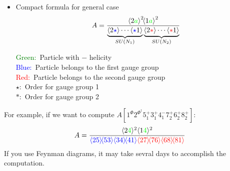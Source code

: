 \documentclass{beamer}
\newcommand{\avg}[1]{\langle #1 \rangle}
\newcommand{\mdavg}[2]{\langle #1 \rangle\!\langle #2 \rangle}
\newcommand{\asqu}[1]{{\langle#1\rangle}^2}
\begin{document}
\begin{frame}
    \begin{itemize}
        \item Compact formula for general case
        \begin{equation*}
            A=\frac{\asqu{2\textcolor{green}{a}}\!\asqu{1\textcolor{green}{a}}}{\underbrace{\avg{2\textcolor{blue}{\star}}\cdots \avg{\textcolor{blue}{\star}1}}_{SU(N_1)}\underbrace{\avg{2\textcolor{red}{\ast} }\cdots \avg{\textcolor{red}{\ast} 1}}_{SU(N_2)}}
        \end{equation*} 
        \begin{minipage}{0.7\textwidth}
            \raggedright  %
            \textcolor{green}{Green:} \,Particle with $-$ helicity\\
            \textcolor{blue}{Blue:}\, Particle belongs to the first gauge group\\
            \textcolor{red}{Red:}\, Particle belongs to the second gauge group\\
            $\star$: \,Order for gauge group 1\\
            $\ast$: \,Order for gauge group 2 
            \end{minipage}
       
    \end{itemize}
    \pause
    For example, if we want to compute $A[1^\Phi2^{\Phi^\dagger}5_1^+3_1^+4_1^-7_2^+6_2^+8_2^+]$:
    \begin{equation*}
        A=\frac{\avg{2\textcolor{green}{4}}^2\avg{1\textcolor{green}{4}}^2}{\textcolor{blue}{\mdavg{25}{53}\mdavg{34}{41}}\textcolor{red}{\mdavg{27}{76}\mdavg{68}{81}}}
    \end{equation*}
    If you use Feynman diagrams, it may take sevral days to accomplish the computation.
\end{frame}
\end{document}
